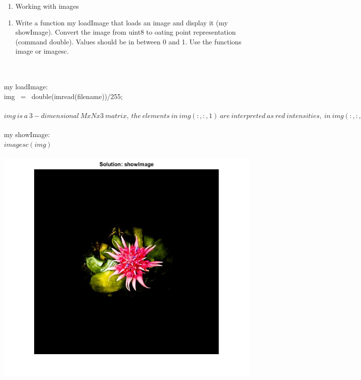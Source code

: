 



\graphicspath{ {images/} }

 
    \begin{enumerate}
         \item[Exercise 1:] Working with images
    \end{enumerate}
    \begin{enumerate}
        \item[(a)] Write a function my loadImage that loads an image and display it (my showImage). Convert the image from uint8 to oating point representation (command double). Values should be in between 0 and 1. Use the functions image or imagesc.
    \end{enumerate}
        \\
        \\ my loadImage:
        \\  img \ = \ double(imread(filename))/255;
        \\\\ $img \ is \ a \ 3-dimensional \ MxNx3 \ matrix, \ the \ elements \ in \ img(:,:,1) \ are \ interpreted \ as \ red \ intensities, \ in \ img(:,:,2) \ as \ green \ intensities, \ and \ in \ img(:,:,3) \ as \ blue \ intensities.$
        \\\\ my showImage:
        \\ $ imagesc(img) $
        \\\\
    	\centering
        \includegraphics[scale=0.58]{images/SolutionFirstPart.jpg} 
